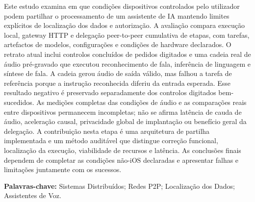 Este estudo examina em que condições dispositivos controlados pelo utilizador podem partilhar o processamento de um assistente de IA mantendo limites explícitos de localização dos dados e autorização. A avaliação compara execução local, gateway HTTP e delegação peer-to-peer cumulativa de etapas, com tarefas, artefactos de modelos, configurações e condições de hardware declarados. O retrato atual inclui controlos concluídos de pedidos digitados e uma cadeia real de áudio pré-gravado que executou reconhecimento de fala, inferência de linguagem e síntese de fala. A cadeia gerou áudio de saída válido, mas falhou a tarefa de referência porque a instrução reconhecida diferiu da entrada esperada. Esse resultado negativo é preservado separadamente dos controlos digitados bem-sucedidos. As medições completas das condições de áudio e as comparações reais entre dispositivos permanecem incompletas; não se afirma latência de cauda de áudio, aceleração causal, privacidade global de implantação ou benefício geral da delegação. A contribuição nesta etapa é uma arquitetura de partilha implementada e um método auditável que distingue correção funcional, localização da execução, viabilidade de recursos e latência. As conclusões finais dependem de completar as condições não-iOS declaradas e apresentar falhas e limitações juntamente com os sucessos.

\textbf{Palavras-chave:} Sistemas Distribuídos; Redes P2P; Localização dos Dados; Assistentes de Voz.
